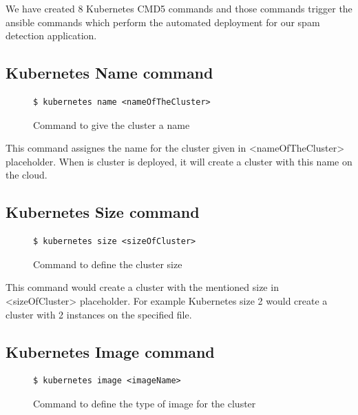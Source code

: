\documentclass[9pt,twocolumn,twoside]{../../styles/osajnl}
\begin{document}
We have created 8 Kubernetes CMD5 commands and those commands trigger
the ansible commands which perform the automated deployment for our
spam detection application.\newline

\subsection{Kubernetes Name command}
\begin{figure}[H]
\begin{verbatim}
$ kubernetes name <nameOfTheCluster>
\end{verbatim}
\caption{Command to give the cluster a name}
\vspace{-4mm}
\label{Command to given the cluster a name}
\end{figure}

This command assignes the name for the cluster given in
<nameOfTheCluster> placeholder. When is cluster is deployed, it will
create a cluster with this name on the cloud.

\subsection{Kubernetes Size command}

\begin{figure}[H]
\begin{verbatim}
$ kubernetes size <sizeOfCluster>
\end{verbatim}
\caption{Command to define the cluster size}
\vspace{-4mm}
\label{Command to define the cluster size}
\end{figure}

This command would create a cluster with the mentioned size in
<sizeOfCluster> placeholder. For example Kubernetes size
2  would create a cluster with 2 instances on the specified file.

\subsection{Kubernetes Image command}
\begin{figure}[H]
\begin{verbatim}
$ kubernetes image <imageName>
\end{verbatim}
\caption{Command to define the type of image for the cluster}
\vspace{-4mm}
\label{Command to define the type of image for the cluster}
\end{figure}
\end{document}
